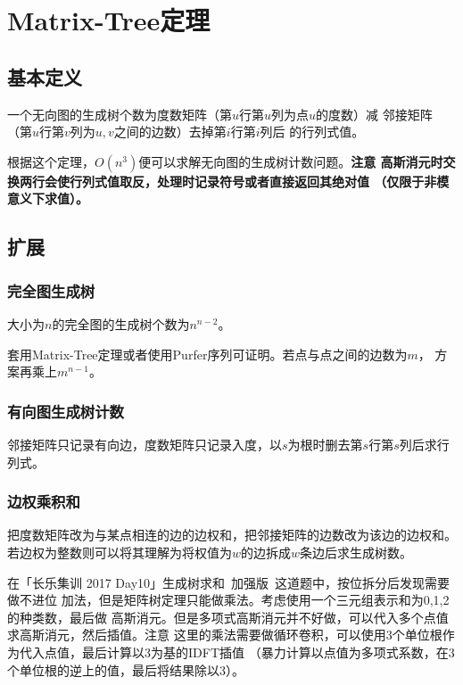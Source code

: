 \section{Matrix-Tree定理}\label{MatrixTree}
\subsection{基本定义}
\begin{theorem}
	一个无向图的生成树个数为度数矩阵（第$u$行第$u$列为点$u$的度数）减
	邻接矩阵（第$u$行第$v$列为$u,v$之间的边数）去掉第$i$行第$i$列后
	的行列式值。
\end{theorem}
根据这个定理，$O(n^3)$便可以求解无向图的生成树计数问题。{\bfseries 注意
高斯消元时交换两行会使行列式值取反，处理时记录符号或者直接返回其绝对值
（仅限于非模意义下求值）。}
\subsection{扩展}
\subsubsection{完全图生成树}
\begin{theorem}
	大小为$n$的完全图的生成树个数为$n^{n-2}$。
\end{theorem}
套用Matrix-Tree定理或者使用Purfer序列可证明。若点与点之间的边数为$m$，
方案再乘上$m^{n-1}$。
\subsubsection{有向图生成树计数}
邻接矩阵只记录有向边，度数矩阵只记录入度，以$s$为根时删去第$s$行第$s$列后求行列式。
\subsubsection{边权乘积和}
把度数矩阵改为与某点相连的边的边权和，把邻接矩阵的边数改为该边的边权和。
若边权为整数则可以将其理解为将权值为$w$的边拆成$w$条边后求生成树数。

在「长乐集训 2017 Day10」生成树求和~加强版~这道题中，按位拆分后发现需要做不进位
加法，但是矩阵树定理只能做乘法。考虑使用一个三元组表示和为0,1,2的种类数，最后做
高斯消元。但是多项式高斯消元并不好做，可以代入多个点值求高斯消元，然后插值。注意
这里的乘法需要做循环卷积，可以使用3个单位根作为代入点值，最后计算以3为基的IDFT插值
（暴力计算以点值为多项式系数，在3个单位根的逆上的值，最后将结果除以3）。

